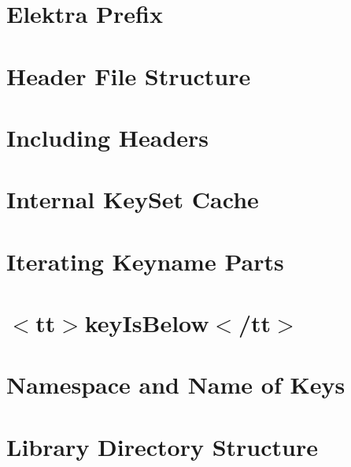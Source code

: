 \let\mypdfximage\pdfximage\def\pdfximage{\immediate\mypdfximage}\documentclass[twoside]{book}
\newcommand{\+}{\discretionary{\mbox{\scriptsize$\hookleftarrow$}}{}{}}
\begin{document}
\chapter{Elektra Prefix}
\label{doc_decisions_4_decided_elektra_prefix_md}

\chapter{Header File Structure}
\label{doc_decisions_4_decided_header_file_structure_md}

\chapter{Including Headers}
\label{doc_decisions_4_decided_header_include_md}

\chapter{Internal Key\+Set Cache}
\label{doc_decisions_4_decided_internal_cache_md}

\chapter{Iterating Keyname Parts}
\label{doc_decisions_4_decided_iterating_name_parts_md}

\chapter{$<$tt$>$key\+Is\+Below$<$/tt$>$}
\label{doc_decisions_4_decided_key_below_md}

\chapter{Namespace and Name of Keys}
\label{doc_decisions_4_decided_keyname_md}

\chapter{Library Directory Structure}
\label{doc_decisions_4_decided_library_directory_structure_md}

\end{document}
